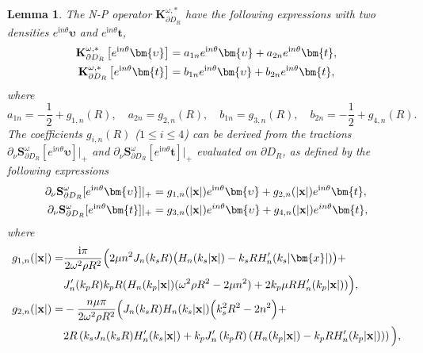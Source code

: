 \documentclass[11pt,reqno,twoside]{amsart}
\newtheorem{lem}{Lemma}[section]
\theoremstyle{definition}
\theoremstyle{remark}
\numberwithin{equation}{section}
\newcommand{\bx}{\mathbf{x}}
\begin{document}
\begin{lem}\label{lem:npz}
	The N-P operator $\mathbf{K}_{\partial D_{R}}^{\omega,*}$ have the following expressions with two densities $e^{\mathrm{i}n\theta}\bm{\upsilon}$ and $e^{\mathrm{i}n\theta}\bm{t}$,
	\begin{align}
		\mathbf{K}_{\partial D_{R}}^{\omega,*}\left[e^{\mathrm{i}n\theta}\bm{\upsilon}\right]&=a_{1n}e^{\mathrm{i}n\theta}\bm{\upsilon}+a_{2n}e^{\mathrm{i}n\theta}\bm{t},\label{equ:kvt}\\
		\mathbf{K}_{\partial D_{R}}^{\omega,*}\left[e^{\mathrm{i}n\theta}\bm{t}\right]&=b_{1n}e^{\mathrm{i}n\theta}\bm{\upsilon}+b_{2n}e^{\mathrm{i}n\theta}\bm{t},\notag
	\end{align}
	where
	\begin{displaymath}
		a_{1n}=-\frac{1}{2}+g_{1,n}(R),\quad a_{2n}=g_{2,n}(R),\quad b_{1n}=g_{3,n}(R),\quad b_{2n}=-\frac{1}{2}+g_{4,n}(R).
	\end{displaymath}
	The coefficients $g_{i,n}(R)$ ($1 \leq i \leq 4$) can be derived from the tractions $\partial_{\nu}\mathbf{S}_{\partial D_{R}}^{\omega}[e^{\mathrm{i}n\theta}\bm{\upsilon}]\big|_{+}$ and $\partial_{\nu}\mathbf{S}_{\partial D_{R}}^{\omega}[e^{\mathrm{i}n\theta}\bm{t}]\big|_{+}$ evaluated on $\partial D_{R}$, as defined by the following expressions
	\begin{align}
		\partial_{\nu}\mathbf{S}_{\partial D_{R}}^{\omega}[e^{\mathrm{i}n\theta}\bm{\upsilon}]|_{+}&=g_{1,n}(|\bx|)e^{\mathrm{i}n\theta}\bm{\upsilon}+g_{2,n}(|\bx|)e^{\mathrm{i}n\theta}\bm{t},\notag\\
		\partial_{\nu}\mathbf{S}_{\partial D_{R}}^{\omega}[e^{\mathrm{i}n\theta}\bm{t}]|_{+}&=g_{3,n}(|\bx|)e^{in\theta}\bm{\upsilon}+g_{4,n}(|\bx|)e^{in\theta}\bm{t},\notag
	\end{align}
	where
	\begin{align}
		g_{1,n}(|\bx|)=&\frac{\mathrm{i}\pi}{2\omega^{2}\rho R^{2}}\Big(2\mu n^{2}J_{n}(k_{s}R)\big(H_{n}(k_{s}|\bx|)-k_{s}RH_{n}^{\prime}(k_{s}|\bm{x}|)\big)+ \notag\\
		&J_n^{\prime}(k_pR)k_pR(H_n(k_p|\bx|)(\omega^2\rho R^2-2\mu n^2)+2k_p\mu RH_n^{\prime}(k_p|\bx|))\Big), \notag\\
		g_{2,n}(|\bx|)=& - \frac{n\mu\pi}{2\omega^{2}\rho R^{2}}\Big(J_{n}(k_{s}R)H_{n}(k_{s}|\bx|)\Big(k_{s}^{2}R^{2}-2n^{2}\Big)+ \notag\\
		&2R\left(k_{s}J_{n}(k_{s}R)H_{n}^{\prime}(k_{s}|\bx|)+k_{p}J_{n}^{\prime}\left(k_{p}R\right)\left(H_{n}(k_{p}|\bx|)-k_{p}RH_{n}^{\prime}(k_{p}|\bx|)\right)\right)\Big), \notag\\

\end{align}
\end{lem}
\end{document}
